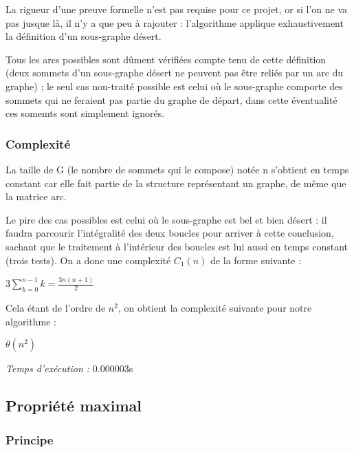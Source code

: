 La rigueur d'une preuve formelle n'est pas requise pour ce projet, or si l'on ne va  pas jusque là, il n'y a que peu à rajouter : l'algorithme applique exhaustivement la définition d'un sous-graphe désert. 

Tous les arcs  possibles sont dûment vérifiées compte tenu de cette définition (deux sommets d'un sous-graphe désert ne peuvent pas être reliés par un arc du graphe) ; le seul cas non-traité possible est celui où le sous-graphe comporte des sommets qui ne feraient pas partie du graphe de départ, dans cette éventualité ces somemts sont simplement ignorés. 

\subsubsection{Complexité}

La taille de G (le nombre de sommets qui le compose) notée n s'obtient en temps constant car elle fait partie de la structure représentant un graphe, de même que la matrice arc. 

Le pire des cas possibles est celui où le sous-graphe est bel et bien désert : il faudra parcourir l'intégralité des deux boucles pour arriver à cette conclusion, sachant que le traitement à l'intérieur des boucles est lui aussi en temps constant (trois tests). On a donc une complexité $C_1(n)$ de la forme suivante :

$3\sum\limits_{k=0}^{n-1} k = \frac{3n(n+1)}{2}$

Cela étant de l'ordre de $n^2$, on obtient la complexité suivante pour notre algorithme : 

$\theta(n^2)$

\emph{Temps d'exécution :}  0.000003s

\subsection{Propriété \og maximal \fg}

\subsubsection{Principe}

